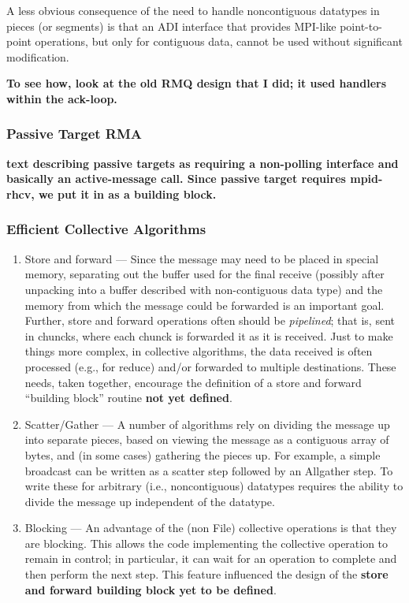 \documentclass{article}
\begin{document}
A less obvious consequence of the need to handle noncontiguous
datatypes in pieces (or segments) is that an ADI interface that
provides MPI-like point-to-point operations, but only for contiguous
data, cannot be used without significant modification.  

\textbf{To see how, look at the old RMQ design that I did; it used
handlers within the ack-loop.} 

\subsubsection{Passive Target RMA}
\label{sec-passive-target}
\textbf{text describing passive targets as requiring a non-polling
interface and basically an active-message call.  Since passive target
requires mpid-rhcv, we put it in as a building block.}

\subsubsection{Efficient Collective Algorithms}
\begin{enumerate}
\item Store and forward --- Since the message may need to be placed in
special memory, separating out the buffer used for the final receive
(possibly after unpacking into a buffer described with non-contiguous
data type) and the memory from which the message could be forwarded is
an important goal.  Further, store and
forward operations often should be \emph{pipelined}; that is, sent in
chuncks, where each chunck is forwarded it as it is received.
Just to make things more complex, in collective algorithms, the data
received is often processed (e.g., for reduce) and/or forwarded to
multiple destinations.  These needs, taken together, encourage the
definition of a store and forward ``building block'' routine
\textbf{not yet defined}.

\item Scatter/Gather --- A number of algorithms rely on dividing the
message up into separate pieces, based on viewing the message as a
contiguous array of bytes, and (in some cases) gathering the pieces
up.  For example, a simple broadcast can be written as a scatter step
followed by an Allgather step.  To write these for arbitrary (i.e.,
noncontiguous) datatypes requires the ability to divide the message up
independent of the datatype.  

\item Blocking --- An advantage of the (non File) collective
operations is that they are blocking.  This allows the code
implementing the collective operation to remain in control; in
particular, it can wait for an operation to complete and then perform
the next step.  This feature influenced the design of the
\textbf{store and forward building block yet to be defined}.
\end{enumerate}
\end{document}
